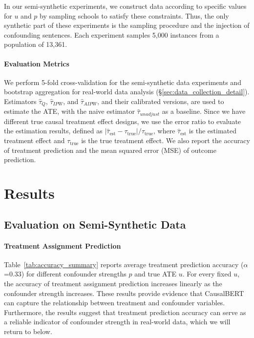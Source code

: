 \documentclass[11pt]{article}
\begin{document}
In our semi-synthetic experiments, we construct data according to specific values for $u$ and $p$ by sampling schools to satisfy these constraints. Thus, the only synthetic part of these experiments is the sampling procedure and the injection of confounding sentences. Each experiment samples 5,000 instances from a population of 13,361.


\paragraph{Evaluation Metrics}
\label{sec:Evaluation_Metrics}
We perform 5-fold cross-validation for the semi-synthetic data experiments and bootstrap aggregation for real-world data analysis (\S\ref{sec:data_collection_detail}). Estimators $\hat{\tau}_{Q}$, \(\hat{\tau}_{IPW}\), and \(\hat{\tau}_{AIPW}\), and their calibrated versions, are used to estimate the ATE, with the naive estimator \(\hat\tau_{unadjust}\) as a baseline. Since we have different true causal treatment effect designs, we use the error ratio to evaluate the estimation results, defined as
$
|\hat{\tau}_{\text{est}} - \tau_{\text{true}}| / \tau_{\text{true}}
$,
where \(\hat{\tau}_{\text{est}}\) is the estimated treatment effect and \(\tau_{\text{true}}\) is the true treatment effect. We also report the accuracy of treatment prediction and the mean squared error (MSE) of outcome prediction.

\section{Results}
\label{sec:results}

\subsection{Evaluation on Semi-Synthetic Data}

\paragraph{Treatment Assignment Prediction} Table~\ref{tab:accuracy_summary} reports average treatment prediction accuracy (\(\alpha\)=0.33) for different confounder strengths $p$ and true ATE $u$. For every fixed $u$, the accuracy of treatment assignment prediction increases linearly as the confounder strength increases. These results provide evidence that CausalBERT can capture the relationship between treatment and confounder variables. 
Furthermore, the results suggest that treatment prediction accuracy can serve as a reliable indicator of confounder strength in real-world data, which we will return to below. 
\end{document}
